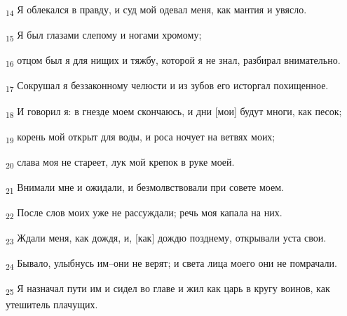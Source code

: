 \begin{tcolorbox}
\textsubscript{14} Я облекался в правду, и суд мой одевал меня, как мантия и увясло.
\end{tcolorbox}
\begin{tcolorbox}
\textsubscript{15} Я был глазами слепому и ногами хромому;
\end{tcolorbox}
\begin{tcolorbox}
\textsubscript{16} отцом был я для нищих и тяжбу, которой я не знал, разбирал внимательно.
\end{tcolorbox}
\begin{tcolorbox}
\textsubscript{17} Сокрушал я беззаконному челюсти и из зубов его исторгал похищенное.
\end{tcolorbox}
\begin{tcolorbox}
\textsubscript{18} И говорил я: в гнезде моем скончаюсь, и дни [мои] будут многи, как песок;
\end{tcolorbox}
\begin{tcolorbox}
\textsubscript{19} корень мой открыт для воды, и роса ночует на ветвях моих;
\end{tcolorbox}
\begin{tcolorbox}
\textsubscript{20} слава моя не стареет, лук мой крепок в руке моей.
\end{tcolorbox}
\begin{tcolorbox}
\textsubscript{21} Внимали мне и ожидали, и безмолвствовали при совете моем.
\end{tcolorbox}
\begin{tcolorbox}
\textsubscript{22} После слов моих уже не рассуждали; речь моя капала на них.
\end{tcolorbox}
\begin{tcolorbox}
\textsubscript{23} Ждали меня, как дождя, и, [как] дождю позднему, открывали уста свои.
\end{tcolorbox}
\begin{tcolorbox}
\textsubscript{24} Бывало, улыбнусь им--они не верят; и света лица моего они не помрачали.
\end{tcolorbox}
\begin{tcolorbox}
\textsubscript{25} Я назначал пути им и сидел во главе и жил как царь в кругу воинов, как утешитель плачущих.
\end{tcolorbox}
